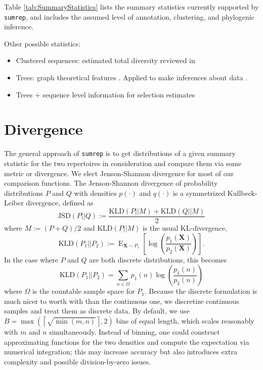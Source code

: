 \documentclass{article}
\begin{document}
Table \ref{tab:SummaryStatistics} lists the summary statistics currently supported by \texttt{sumrep}, and includes the assumed level of annotation, clustering, and phylogenic inference.

Other possible statistics:

\begin{itemize}
\item Clustered sequences: estimated total diversity reviewed in \cite{Mehr2012-se}
\item Trees: graph theoretical features \cite{Dunn-Walters2002-cu,Dunn-Walters2004-hv,Mehr2004-ej,Shahaf2008-cc,Budeus2015-ab,Yaari2015-ss}.
Applied to make inferences about data \cite{Steiman-Shimony2006-fm}.
\item Trees + sequence level information for selection estimates \cite{Uduman2014-pb}
\end{itemize}


\section*{Divergence}
The general approach of \texttt{sumrep} is to get distributions of a given summary statistic for the two repertoires in consideration and compare them via some metric or divergence.
We elect Jenson-Shannon divergence for most of our comparison functions.
The Jenson-Shannon divergence of probability distributions $P$ and $Q$ with densities $p(\cdot)$ and $q(\cdot)$ is a symmetrized Kullbeck-Leiber divergence, defined as
\begin{equation}
\text{JSD}\left(P || Q\right) := \frac{\text{KLD}\left(P || M\right) + \text{KLD}\left(Q || M\right)}{2}
\end{equation}
where $M := (P + Q)/2$ and $\text{KLD}(P || M)$ is the usual KL-divergence,
\begin{equation}
\text{KLD}\left(P_1 || P_2\right) := \operatorname{E}_{\mathbf X \sim P_1}\left[ \log\left(\frac{p_1(\mathbf X)}{p_2(\mathbf X)}\right) \right].
\end{equation}
In the case where $P$ and $Q$ are both discrete distributions, this becomes
\begin{equation}
\text{KLD}\left(P_1 || P_2\right) = \sum_{n \in \Omega} p_1(n) \log\left( \frac{p_1(n)}{p_2(n)} \right)
\end{equation}
where $\Omega$ is the countable sample space for $P_1$.
Because the discrete formulation is much nicer to worth with than the continuous one, we discretize continuous samples and treat them as discrete data.
By default, we use $B = \max\left(\left\lceil \sqrt{\min(m, n)} \right \rceil, 2\right)$ bins of equal length, which scales reasonably with $m$ and $n$ simultaneously.
Instead of binning, one could construct approximating functions for the two densities and compute the expectation via numerical integration; this may increase accuracy but also introduces extra complexity and possible division-by-zero issues.
\end{document}
